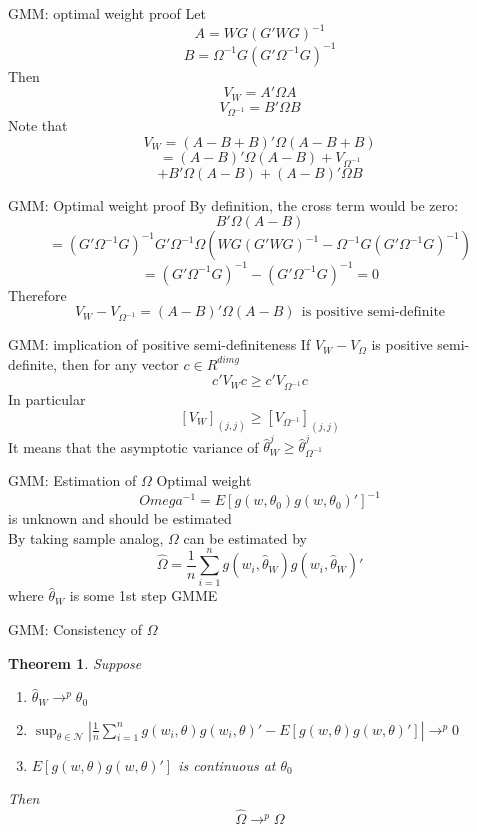 \documentclass{beamer}
\newtheorem{thm}{Theorem}[subsection]
\begin{document}
\begin{frame}{GMM: optimal weight proof}
	Let 
	\[A = WG(G'WG)^{-1}\]
	\[B = \Omega^{-1} G(G' \Omega^{-1} G)^{-1}\]
	Then
	\[V_W = A' \Omega A\]
	\[V_{\Omega^{-1}} = B' \Omega B\]
	Note that
	\[V_W = (A-B+B)' \Omega(A-B+B)\]
	\[= (A-B)' \Omega (A-B) + V_{\Omega^{-1}}\]
	\[+B'\Omega(A-B) + (A-B)' \Omega B\]
\end{frame}
\begin{frame}{GMM: Optimal weight proof}
	By definition, the cross term would be zero:
	\[B' \Omega (A - B)\]
	\[= (G' \Omega^{-1} G)^{-1} G' \Omega^{-1} \Omega (WG(G'WG)^{-1} - \Omega^{-1} G(G' \Omega^{-1} G)^{-1})\]
	\[=(G' \Omega^{-1} G)^{-1} - (G' \Omega^{-1} G)^{-1} = 0\]
	Therefore
	\[V_W - V_{\Omega^{-1}} = (A-B)' \Omega (A-B) \ \ \text{is positive semi-definite}\]
\end{frame}
\begin{frame}{GMM: implication of positive semi-definiteness}
	If $V_W - V_{\Omega}$ is positive semi-definite, then for any vector $c \in R^{dim g}$
	\[c'V_Wc \geq c'V_{\Omega^{-1}} c\]
	In particular
	\[[V_W]_{(j,j)} \geq [V_{\Omega^{-1}}]_{(j,j)}\]
	It means that the asymptotic variance of $\hat{\theta}^j_W \geq \hat{\theta}^j_{\Omega^{-1}}$
\end{frame}
\begin{frame}{GMM: Estimation of $\Omega$}
	Optimal weight
	\[Omega^{-1} = E[g(w,\theta_0)g(w,\theta_0)']^{-1}\]
	is unknown and should be estimated  \\
	By taking sample analog, $\Omega$ can be estimated by 
	\[\hat{\Omega} = \frac{1}{n} \sum^n_{i=1} g(w_i, \hat{\theta}_W)g(w_i,\hat{\theta}_W)'\]
	where $\hat{\theta}_W$ is some 1st step GMME
\end{frame}
\begin{frame}{GMM: Consistency of $\Omega$}
	\begin{thm}
		Suppose
		\begin{enumerate}
			\item $\hat{\theta}_W \rightarrow^p \theta_0$
			\item $\sup_{\theta \in \mathcal{N}} |\frac{1}{n} \sum^n_{i=1} g(w_i,\theta) g(w_i, \theta)' - E[g(w,\theta) g(w,\theta)']| \rightarrow^p 0$
			\item $E[g(w,\theta)g(w,\theta)']$ is continuous at $\theta_0$
		\end{enumerate}
		Then
		\[\hat{\Omega} \rightarrow^p \Omega\]
	\end{thm}
\end{frame}
\end{document}
